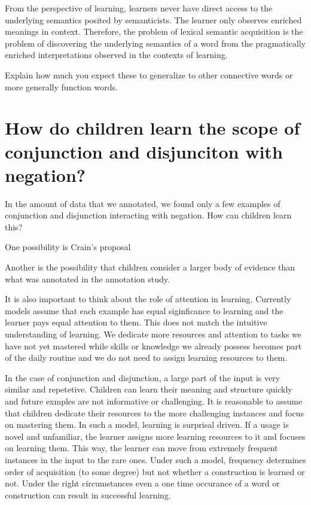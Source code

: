 \documentclass[oneside]{report}
\theoremstyle{definition}
\theoremstyle{definition}
\theoremstyle{definition}
\theoremstyle{remark}
\begin{document}
From the perspective of learning, learners never have direct access to
the underlying semantics posited by semanticists. The learner only
observes enriched meanings in context. Therefore, the problem of lexical
semantic acquisition is the problem of discovering the underlying
semantics of a word from the pragmatically enriched interpretations
observed in the contexts of learning.

Explain how much you expect these to generalize to other connective
words or more generally function words.

\section{How do children learn the scope of conjunction and disjunciton
with
negation?}\label{how-do-children-learn-the-scope-of-conjunction-and-disjunciton-with-negation}

In the amount of data that we annotated, we found only a few examples of
conjunction and disjunction interacting with negation. How can children
learn this?

One possibility is Crain's proposal

Another is the possibility that children consider a larger body of
evidence than what was annotated in the annotation study.

It is also important to think about the role of attention in learning.
Currently models assume that each example has equal siginficance to
learning and the learner pays equal attention to them. This does not
match the intuitive understanding of learning. We dedicate more
resources and attention to tasks we have not yet mastered while skills
or knowledge we already possess becomes part of the daily routine and we
do not need to assign learning resources to them.

In the case of conjunction and disjunction, a large part of the input is
very similar and repetetive. Children can learn their meaning and
structure quickly and future exmples are not informative or challenging.
It is reasonable to assume that children dedicate their resources to the
more challenging instances and focus on mastering them. In such a model,
learning is surprisal driven. If a usage is novel and unfamiliar, the
learner assigns more learning resources to it and focuses on learning
them. This way, the learner can move from extremely frequent instances
in the input to the rare ones. Under such a model, frequency determines
order of acquisition (to some degree) but not whether a construction is
learned or not. Under the right circumstances even a one time occurance
of a word or construction can result in successful learning.
\end{document}
